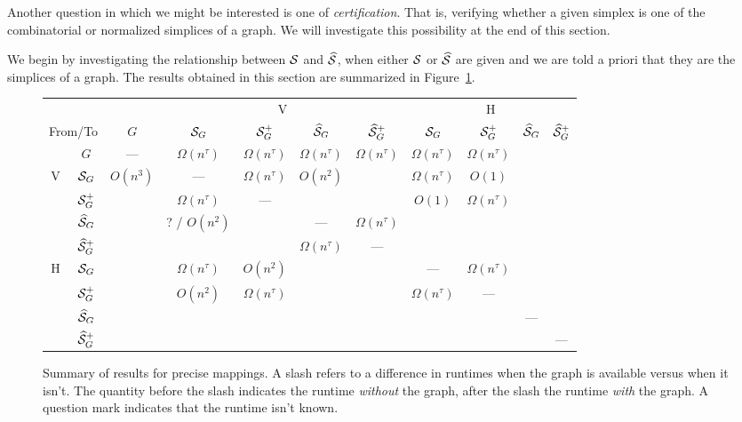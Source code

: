 Another question in which we might be interested is one of \emph{certification}. That is, verifying whether  a given simplex is one of the combinatorial or normalized simplices of a graph. We will investigate  this possibility at  the end of this  section. 

We begin by investigating the relationship between $\mathcal{S}$ and $\widehat{\mathcal{S}}$, when either  $\mathcal{S}$ or $\widehat{\mathcal{S}}$ are given and we are told a priori that they are the simplices of a graph. The results obtained  in this section are summarized in Figure~\ref{fig:mapping_results}. 

\begin{figure}
	\centering
	\renewcommand{\arraystretch}{1.5}	\begin{tabular}{|c|c|c|c|c|c|c|c|c|c|c|}
		\hline 
		\multicolumn{3}{|c|}{} & \multicolumn{4}{c|}{\textsf{V}} & \multicolumn{4}{c|}{\textsf{H}}\\
	\cline{3-11} 
\multicolumn{2}{|r|}{From/To} & $G$ & $\mathcal{S}_G$ & $\mathcal{S}_G^+$ & $\widehat{\mathcal{S}}_G$ & $\widehat{\mathcal{S}}_G^+$ & $\mathcal{S}_G$ & $\mathcal{S}_G^+$ & $\widehat{\mathcal{S}}_G$ & $\widehat{\mathcal{S}}_G^+$ \\
\cline{2-11} 
& $G$ & --- &$\Omega(n^\tau)$ &$\Omega(n^\tau)$ &$\Omega(n^\tau)$ &$\Omega(n^\tau)$ & $\Omega(n^\tau)$ & $\Omega(n^\tau)$ &  & \\
\hline 
\multirow{4}{0.4cm}{\textsf{V}} & $\mathcal{S}_G$ & $O(n^3)$ & --- & $\Omega(n^\tau)$ & $O(n^2)$ & & $\Omega(n^\tau)$ & $O(1)$ & & \\
\cline{2-11}
& $\mathcal{S}_G^+$ & & $\Omega(n^\tau)$ & --- & & & $O(1)$ &$\Omega(n^\tau)$ & & \\
\cline{2-11}
& $\widehat{\mathcal{S}}_G$ & & ?  / $O(n^2)$ &  & --- & $\Omega(n^\tau)$ & & & &\\
\cline{2-11}
& $\widehat{\mathcal{S}}_G^+$ & & & &$\Omega(n^\tau)$ & --- & & & & \\
\hline 
\multirow{4}{0.4cm}{\textsf{H}} & $\mathcal{S}_G$ & & $\Omega(n^\tau)$ & $O(n^2)$ & & &--- & $\Omega(n^\tau)$& & \\
\cline{2-11}
& $\mathcal{S}_G^+$ & & $O(n^2)$ & $\Omega(n^\tau)$ & & &$\Omega(n^\tau)$ & --- & & \\
\cline{2-11}
& $\widehat{\mathcal{S}}_G$ & & & & &  & & & --- &\\
\cline{2-11}
& $\widehat{\mathcal{S}}_G^+$ & & & & & & & & & --- \\
\hline 
	\end{tabular}
	\renewcommand{\arraystretch}{1}
\caption{Summary of results for precise mappings. A slash refers to a difference in runtimes when the graph is available versus when it isn't. The quantity before the slash indicates the runtime \emph{without} the graph, after the slash the runtime \emph{with} the graph. A question mark indicates that the runtime isn't known.}
\label{fig:mapping_results}
\end{figure}

